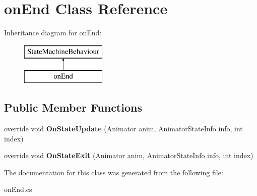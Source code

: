 \hypertarget{classon_end}{}\section{on\+End Class Reference}
\label{classon_end}
Inheritance diagram for on\+End\+:\begin{figure}[H]
\begin{center}
\leavevmode
\includegraphics[height=2.000000cm]{classon_end}
\end{center}
\end{figure}
\subsection*{Public Member Functions}
\begin{DoxyCompactItemize}
\item 
\mbox{\label{classon_end_a0e085abec95b7177c87310660196377d}} 
override void {\bfseries On\+State\+Update} (Animator anim, Animator\+State\+Info info, int index)
\item 
\mbox{\label{classon_end_a4154e5dd9fe74d881feb2e0bbfc931ab}} 
override void {\bfseries On\+State\+Exit} (Animator anim, Animator\+State\+Info info, int index)
\end{DoxyCompactItemize}


The documentation for this class was generated from the following file\+:\begin{DoxyCompactItemize}
\item 
on\+End.\+cs\end{DoxyCompactItemize}
